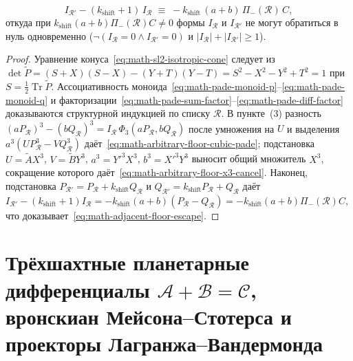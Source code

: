 \begin{theorem}
\begin{enumerate}[label=\textbf{(\arabic*)},leftmargin=*]
  \begin{equation}
    \label{eq:math-adjacent-floor-escape}
    I_{\mathcal{R}'} - (k_{\mathrm{shift}} + 1)\,I_{\mathcal{R}} \;\equiv\; -k_{\mathrm{shift}}\,(a + b)\,\Pi_-(\mathcal{R})\,C,
  \end{equation}
  откуда при $k_{\mathrm{shift}}(a+b)\Pi_-(\mathcal{R})C \ne 0$ формы $I_{\mathcal{R}}$ и $I_{\mathcal{R}'}$ не могут обратиться в нуль одновременно ($\neg(I_{\mathcal{R}} = 0 \land I_{\mathcal{R}'} = 0)$ и $|I_{\mathcal{R}}| + |I_{\mathcal{R}'}| \ge 1$).
\end{enumerate}
\end{theorem}

\begin{proof}
\leanok
Уравнение конуса~\eqref{eq:math-sl2-isotropic-cone} следует из $\det\widetilde{P} = (S+X)(S-X) - (Y+T)(Y-T) = S^2 - X^2 - Y^2 + T^2 = 1$ при $S = \frac{1}{2}\operatorname{Tr}\widetilde{P}$. Ассоциативность моноида~\eqref{eq:math-pade-monoid-p}--\eqref{eq:math-pade-monoid-q} и факторизации~\eqref{eq:math-pade-sum-factor}--\eqref{eq:math-pade-diff-factor} доказываются структурной индукцией по списку $\mathcal{R}$. В пункте~(3) разность $(a P_{\mathcal{R}})^3 - (b Q_{\mathcal{R}})^3 = I_{\mathcal{R}}\,\Phi_3(a P_{\mathcal{R}}, b Q_{\mathcal{R}})$ после умножения на $U$ и выделения $a^3(U P_{\mathcal{R}}^3 - V Q_{\mathcal{R}}^3)$ даёт~\eqref{eq:math-arbitrary-floor-cubic-pade}; подстановка $U = \widetilde{A}X^3$, $V = \widetilde{B}Y^3$, $a^3 = Y'^3 X^3$, $b^3 = X'^3 Y^3$ выносит общий множитель $X^3$, сокращение которого даёт~\eqref{eq:math-arbitrary-floor-x3-cancel}. Наконец, подстановка $P_{\mathcal{R}'} = P_{\mathcal{R}} + k_{\mathrm{shift}}Q_{\mathcal{R}}$ и $Q_{\mathcal{R}'} = k_{\mathrm{shift}}P_{\mathcal{R}} + Q_{\mathcal{R}}$ даёт $I_{\mathcal{R}'} - (k_{\mathrm{shift}}+1)I_{\mathcal{R}} = -k_{\mathrm{shift}}(a+b)(P_{\mathcal{R}} - Q_{\mathcal{R}}) = -k_{\mathrm{shift}}(a+b)\Pi_-(\mathcal{R})C$, что доказывает~\eqref{eq:math-adjacent-floor-escape}.
\end{proof}

\chapter{Трёхшахтные планетарные дифференциалы \texorpdfstring{$\mathcal{A} + \mathcal{B} = \mathcal{C}$}{A + B = C}, вронскиан Мейсона--Стотерса и проекторы Лагранжа--Вандермонда}
\label{ch:math-planetary-differentials}

